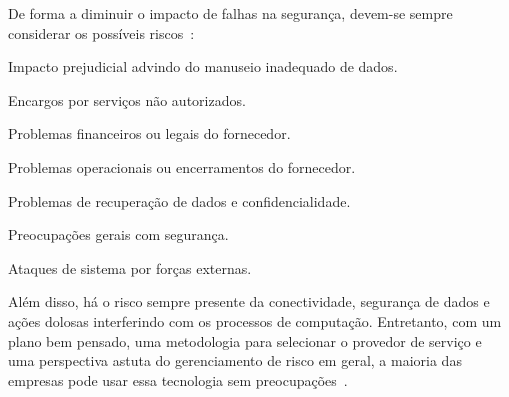 De forma a diminuir o impacto de falhas na segurança, devem-se sempre considerar os
possíveis riscos~\cite{cloud-computing-fundamentals}:
\begin{itemise}
    \item Impacto prejudicial advindo do manuseio inadequado de dados.
    \item Encargos por serviços não autorizados.
    \item Problemas financeiros ou legais do fornecedor.
    \item Problemas operacionais ou encerramentos do fornecedor.
    \item Problemas de recuperação de dados e confidencialidade.
    \item Preocupações gerais com segurança.
    \item Ataques de sistema por forças externas.
\end{itemise}

Além disso, há o risco sempre presente da conectividade, segurança de dados e
ações dolosas interferindo com os processos de computação. Entretanto, com um
plano bem pensado, uma metodologia para selecionar o provedor de serviço e uma
perspectiva astuta do gerenciamento de risco em geral, a maioria das empresas
pode usar essa tecnologia sem preocupações~\cite{cloud-computing-fundamentals}.
